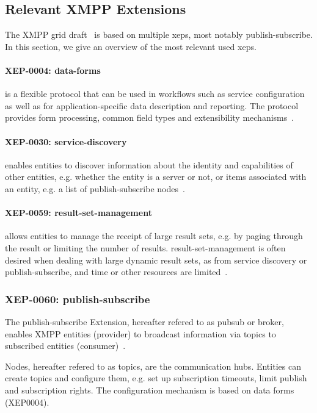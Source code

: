 \subsection{Relevant XMPP Extensions}

The XMPP grid draft~\cite{ietf-mile-xmpp-grid-05} is based on multiple \glspl{xep}, most notably \gls{publish-subscribe}. In this section, we give an overview of the most relevant used \glspl{xep}.

\paragraph{XEP-0004: \gls{data-forms}} is a flexible protocol that can be used in workflows such as service configuration as well as for application-specific data description and reporting. The protocol provides form processing, common field types and extensibility mechanisms~\cite{xep-0004}.

\paragraph{XEP-0030: \gls{service-discovery}} enables entities to discover information about the identity and capabilities of other entities, e.g. whether the entity is a server or not, or items associated with an entity, e.g. a list of \gls{publish-subscribe} nodes~\cite{xep-0030}.

\paragraph{XEP-0059: \Gls{result-set-management}} allows entities to manage the receipt of large result sets, e.g. by paging through the result or limiting the number of results. \gls{result-set-management} is often desired when dealing with large dynamic result sets, as from service discovery or publish-subscribe, and time or other resources are limited~\cite{xep-0059}.

\subsubsection{XEP-0060: \Gls{publish-subscribe}}
The \gls{publish-subscribe} Extension, hereafter refered to as \gls{pubsub} or \gls{broker}, enables XMPP entities (\gls{provider}) to broadcast information via \glspl{topic} to subscribed entities (\gls{consumer})~\cite{xep-0060}.

Nodes, hereafter refered to as \glspl{topic}, are the communication hubs. Entities can create topics and configure them, e.g. set up subscription timeouts, limit publish and subscription rights. The configuration mechanism is based on data forms (XEP0004).

